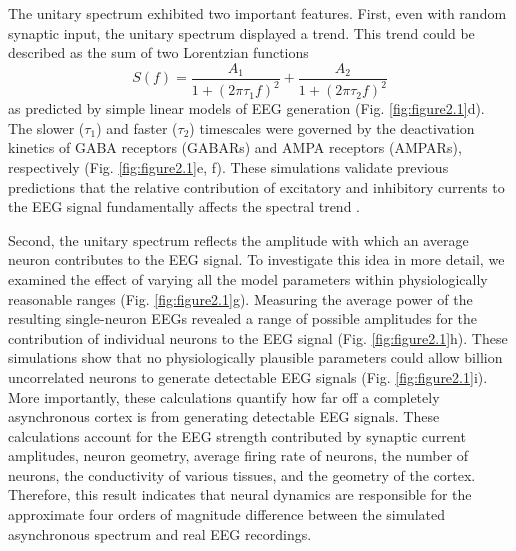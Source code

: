 The unitary spectrum exhibited two important features. First, even with random synaptic input, the unitary spectrum displayed a trend. This trend could be described as the sum of two Lorentzian functions
\begin{equation} \label{eq:linear_model}
    S(f) = \frac{A_1}{1+(2\pi \tau_1 f)^2} + \frac{A_2}{1+(2\pi \tau_2 f)^2}
\end{equation}
as predicted by simple linear models of EEG generation \cite{Gao2017,Miller2009} (Fig. \ref{fig:figure2.1}d). The slower ($\tau_1$) and faster ($\tau_2$) timescales were governed by the deactivation kinetics of GABA receptors (GABARs) and AMPA receptors (AMPARs), respectively (Fig. \ref{fig:figure2.1}e, f). These simulations validate previous predictions that the relative contribution of excitatory and inhibitory currents to the EEG signal fundamentally affects the spectral trend \cite{Gao2017}.

Second, the unitary spectrum reflects the amplitude with which an average neuron contributes to the EEG signal. To investigate this idea in more detail, we examined the effect of varying all the model parameters within physiologically reasonable ranges (Fig. \ref{fig:figure2.1}g). Measuring the average power of the resulting single-neuron EEGs revealed a range of possible amplitudes for the contribution of individual neurons to the EEG signal (Fig. \ref{fig:figure2.1}h). These simulations show that no physiologically plausible parameters could allow  \cite{Gao2017} billion uncorrelated neurons to generate detectable EEG signals (Fig. \ref{fig:figure2.1}i). More importantly, these calculations quantify how far off a completely asynchronous cortex is from generating detectable EEG signals. These calculations account for the EEG strength contributed by synaptic current amplitudes, neuron geometry, average firing rate of neurons, the number of neurons, the conductivity of various tissues, and the geometry of the cortex. Therefore, this result indicates that neural dynamics are responsible for the approximate four orders of magnitude difference between the simulated asynchronous spectrum and real EEG recordings.

